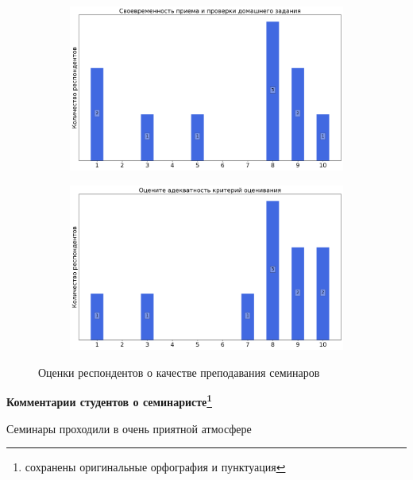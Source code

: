 \begin{figure}[H]
\begin{subfigure}[b]{0.45\textwidth}
                \includegraphics[width=\textwidth]{images/2 course/Компьютерные технологии/seminarists-marks-Кулиев Р.С.-2.png}
            \end{subfigure}
            \begin{subfigure}[b]{0.45\textwidth}
                \centering
                \includegraphics[width=\textwidth]{images/2 course/Компьютерные технологии/seminarists-marks-Кулиев Р.С.-3.png}
            \end{subfigure}	
            \caption{Оценки респондентов о качестве преподавания семинаров}
        \end{figure}

        \textbf{Комментарии студентов о семинаристе\protect\footnote{сохранены оригинальные орфография и пунктуация}}
            \begin{commentbox} 
                Семинары проходили в очень приятной атмосфере  
            \end{commentbox} 
        
